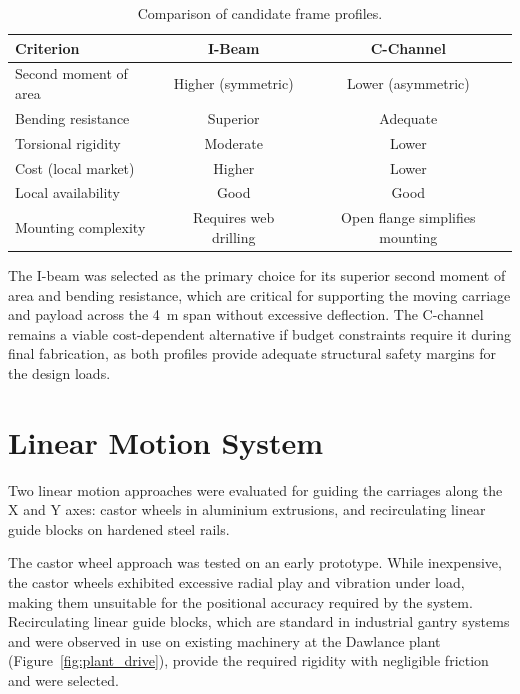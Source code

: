 \begin{table}[H]
    \centering
    \caption{Comparison of candidate frame profiles.}
    \label{tab:frame_comparison}
    \renewcommand{\arraystretch}{1.2}
    \begin{tabular}{@{}lcc@{}}
        \toprule
        \textbf{Criterion} & \textbf{I-Beam} & \textbf{C-Channel} \\
        \midrule
        Second moment of area & Higher (symmetric) & Lower (asymmetric) \\
        Bending resistance & Superior & Adequate \\
        Torsional rigidity & Moderate & Lower \\
        Cost (local market) & Higher & Lower \\
        Local availability & Good & Good \\
        Mounting complexity & Requires web drilling & Open flange simplifies mounting \\
        \bottomrule
    \end{tabular}
\end{table}

The I-beam was selected as the primary choice for its superior second moment of area and bending resistance, which are critical for supporting the moving carriage and payload across the \SI{4}{m} span without excessive deflection. The C-channel remains a viable cost-dependent alternative if budget constraints require it during final fabrication, as both profiles provide adequate structural safety margins for the design loads.

\section{Linear Motion System}

Two linear motion approaches were evaluated for guiding the carriages along the X and Y axes: castor wheels in aluminium extrusions, and recirculating linear guide blocks on hardened steel rails.

The castor wheel approach was tested on an early prototype. While inexpensive, the castor wheels exhibited excessive radial play and vibration under load, making them unsuitable for the positional accuracy required by the system. Recirculating linear guide blocks, which are standard in industrial gantry systems and were observed in use on existing machinery at the Dawlance plant (Figure~\ref{fig:plant_drive}), provide the required rigidity with negligible friction and were selected.

